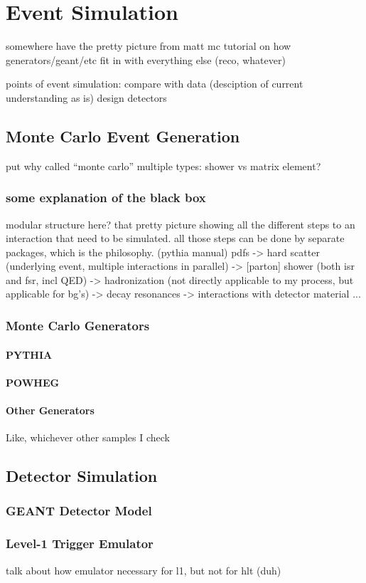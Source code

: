 \chapter{Event Simulation}
somewhere have the pretty picture from 
matt mc tutorial on how generators/geant/etc 
fit in with everything else (reco, whatever)

points of event simulation: 
compare with data (desciption of current understanding as is) 
design detectors

\section{Monte Carlo Event Generation}
put why called ``monte carlo''
multiple types: shower vs matrix element?
\subsection{some explanation of the black box}
modular structure here?  that pretty picture showing all the 
different steps to an interaction that need to be 
simulated. 
all those steps can be done by separate packages, 
which is the philosophy.  (pythia manual)
pdfs ->
hard scatter (underlying event, multiple interactions in parallel) ->
[parton] shower (both isr and fsr, incl QED) ->
hadronization (not directly applicable to my process, but applicable for bg's) -> 
decay resonances -> interactions with detector material ...
\subsection{Monte Carlo Generators}
\subsubsection{PYTHIA}
\subsubsection{POWHEG}
\subsubsection{Other Generators}
Like, whichever other samples I check

\section{Detector Simulation}
\subsection{GEANT Detector Model}

\subsection{Level-1 Trigger Emulator}
talk about how emulator necessary for l1, but not for hlt (duh)
